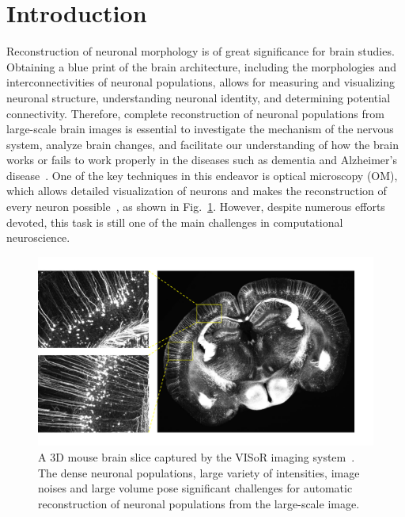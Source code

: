 \section{Introduction}
\label{sec:introduction}

Reconstruction of neuronal morphology is of great significance for brain studies. Obtaining a blue print of the brain architecture, including the morphologies and interconnectivities of neuronal populations, allows for measuring and visualizing neuronal structure, understanding neuronal identity, and determining potential connectivity.
Therefore, complete reconstruction of neuronal populations from large-scale brain images is essential to investigate the mechanism of the nervous system, analyze brain changes, and facilitate our understanding of how the brain works or fails to work properly in the diseases such as dementia and Alzheimer's disease~\cite{Petrella2003, Giorgio2013}.
One of the key techniques in this endeavor is optical microscopy (OM), which allows detailed visualization of neurons and makes the reconstruction of every neuron possible~\cite{Senft2011}, as shown in Fig.~\ref{fig:brain}.
However, despite numerous efforts devoted, this task is still one of the main challenges in computational neuroscience.

\begin{figure}[t]
	\centering
	\includegraphics[width=1\columnwidth]{./Illustrations/brain2.pdf}
	\caption{A 3D mouse brain slice captured by the VISoR imaging system~\cite{Wang2019}. The dense neuronal populations, large variety of intensities, image noises and large volume pose significant challenges for automatic reconstruction of neuronal populations from the large-scale image.}	
	\label{fig:brain}
\end{figure}

